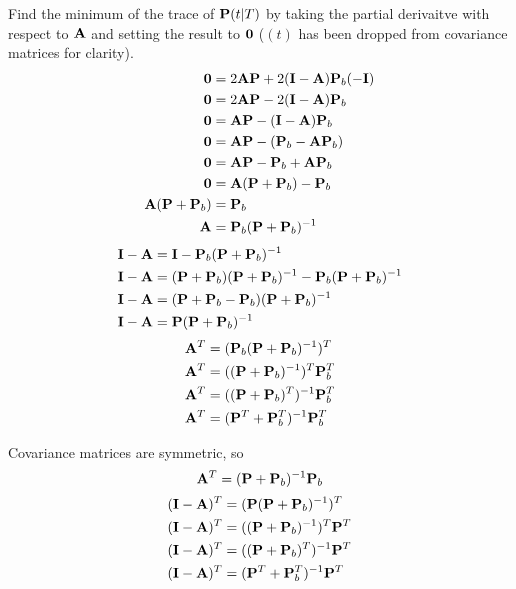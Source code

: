 Find the minimum of the trace of $\mathbf{P}(t|T)$ by taking the partial derivaitve
with respect to $\mathbf{A}$ and setting the result to $\mathbf{0}$ ($(t)$ has been
dropped from covariance matrices for clarity).
\begin{align}
  \mathbf{0} &= 2\mathbf{A}\mathbf{P} + 2(\mathbf{I} - \mathbf{A})\mathbf{P}_b(-\mathbf{I}) \nonumber
    \\
  \mathbf{0} &= 2\mathbf{A}\mathbf{P} - 2(\mathbf{I} - \mathbf{A})\mathbf{P}_b \nonumber \\
  \mathbf{0} &= \mathbf{A}\mathbf{P} - (\mathbf{I} - \mathbf{A})\mathbf{P}_b \nonumber \\
  \mathbf{0} &= \mathbf{A}\mathbf{P} - (\mathbf{P}_b - \mathbf{A}\mathbf{P}_b) \nonumber \\
  \mathbf{0} &= \mathbf{A}\mathbf{P} - \mathbf{P}_b + \mathbf{A}\mathbf{P}_b \nonumber \\
  \mathbf{0} &= \mathbf{A}(\mathbf{P} + \mathbf{P}_b) - \mathbf{P}_b \nonumber \\
  \mathbf{A}(\mathbf{P} + \mathbf{P}_b) &= \mathbf{P}_b \nonumber \\
  \mathbf{A} &= \mathbf{P}_b(\mathbf{P} + \mathbf{P}_b)^{-1} \label{eq:ks_a1}
\end{align}
\begin{align}
  \mathbf{I} - \mathbf{A} &= \mathbf{I} - \mathbf{P}_b(\mathbf{P} + \mathbf{P}_b)^{-1} \nonumber
    \\
  \mathbf{I} - \mathbf{A} &= (\mathbf{P} + \mathbf{P}_b)(\mathbf{P} + \mathbf{P}_b)^{-1} -
    \mathbf{P}_b(\mathbf{P} + \mathbf{P}_b)^{-1} \nonumber \\
  \mathbf{I} - \mathbf{A} &= (\mathbf{P} + \mathbf{P}_b - \mathbf{P}_b)
    (\mathbf{P} + \mathbf{P}_b)^{-1} \nonumber \\
  \mathbf{I} - \mathbf{A} &= \mathbf{P}(\mathbf{P} + \mathbf{P}_b)^{-1}
\end{align}
\begin{align*}
  \mathbf{A}^T &= (\mathbf{P}_b(\mathbf{P} + \mathbf{P}_b)^{-1})^T \\
  \mathbf{A}^T &= ((\mathbf{P} + \mathbf{P}_b)^{-1})^T\mathbf{P}_b^T \\
  \mathbf{A}^T &= ((\mathbf{P} + \mathbf{P}_b)^T)^{-1}\mathbf{P}_b^T \\
  \mathbf{A}^T &= (\mathbf{P}^T + \mathbf{P}_b^T)^{-1}\mathbf{P}_b^T
\end{align*}

Covariance matrices are symmetric, so
\begin{equation}
  \mathbf{A}^T = (\mathbf{P} + \mathbf{P}_b)^{-1}\mathbf{P}_b
\end{equation}
\begin{align*}
  (\mathbf{I} - \mathbf{A})^T &= (\mathbf{P}(\mathbf{P} + \mathbf{P}_b)^{-1})^T \\
  (\mathbf{I} - \mathbf{A})^T &= ((\mathbf{P} + \mathbf{P}_b)^{-1})^T\mathbf{P}^T \\
  (\mathbf{I} - \mathbf{A})^T &= ((\mathbf{P} + \mathbf{P}_b)^T)^{-1}\mathbf{P}^T \\
  (\mathbf{I} - \mathbf{A})^T &= (\mathbf{P}^T + \mathbf{P}_b^T)^{-1}\mathbf{P}^T
\end{align*}

